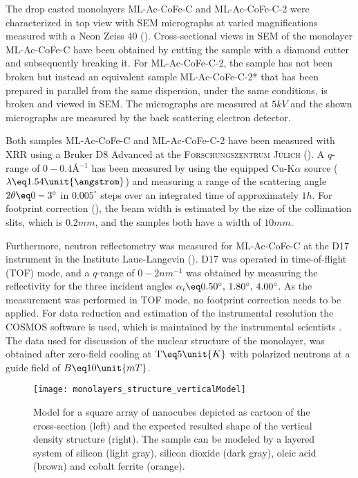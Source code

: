 \documentclass[\main/dresen_thesis.tex]{subfiles}
\begin{document}
  \label{sec:monolayers:monolayerCharacterization}
    The drop casted monolayers ML-Ac-CoFe-C and ML-Ac-CoFe-C-2 were characterized in top view with SEM micrographs at varied magnifications measured with a Neon Zeiss 40 ().
    Cross-sectional views in SEM of the monolayer ML-Ac-CoFe-C have been obtained by cutting the sample with a diamond cutter and subsequently breaking it.
    For ML-Ac-CoFe-C-2, the sample has not been broken but instead an equivalent sample ML-Ac-CoFe-C-2* that has been prepared in parallel from the same dispersion, under the same conditions, is broken and viewed in SEM.
    The micrographs are measured at $5 \unit{kV}$ and the shown micrographs are measured by the back scattering electron detector.

    Both samples ML-Ac-CoFe-C and ML-Ac-CoFe-C-2 have been measured with XRR using a Bruker D8 Advanced at the \textsc{Forschungszentrum J\"ulich} ().
    A $q$-range of $0 - 0.4 \unit{\angstrom^{-1}}$ has been measured by using the equipped Cu-K$\alpha$ source ($\lambda \eq 1.54 \unit{\angstrom}$) and measuring a range of the scattering angle $2 \theta \eq 0 - 3 ^\circ$ in $0.005 ^\circ$ steps over an integrated time of approximately $1 \unit{h}$.
    For footprint correction (), the beam width is estimated by the size of the collimation slits, which is $0.2 \unit{mm}$, and the samples both have a width of $10 \unit{mm}$.

    Furthermore, neutron reflectometry was measured for ML-Ac-CoFe-C at the D17 instrument in the Institute Laue-Langevin ().
    D17 was operated in time-of-flight (TOF) mode, and a $q$-range of $0 - 2 \unit{nm^{-1}}$ was obtained by measuring the reflectivity for the three incident angles $\alpha_i \eq 0.50^\circ ,\, 1.80^\circ ,\, 4.00^\circ$.
    As the measurement was performed in TOF mode, no footprint correction needs to be applied.
    For data reduction and estimation of the instrumental resolution the COSMOS software is used, which is maintained by the instrumental scientists \cite{Gutfreund_2018_Towar}.
    The data used for discussion of the nuclear structure of the monolayer, was obtained after zero-field cooling at $\mathrm{T} \eq 5 \unit{K}$ with polarized neutrons at a guide field of $B \eq 10 \unit{mT}$.

    \begin{figure}[tb]
      \centering
      \texttt{[image: monolayers\_structure\_verticalModel]}
      \caption{\label{fig:monolayers:structure:verticalModel}Model for a square array of nanocubes depicted as cartoon of the cross-section (left) and the expected resulted shape of the vertical density structure (right). The sample can be modeled by a layered system of silicon (light gray), silicon dioxide (dark gray), oleic acid (brown) and cobalt ferrite (orange). }
    \end{figure}
\end{document}
